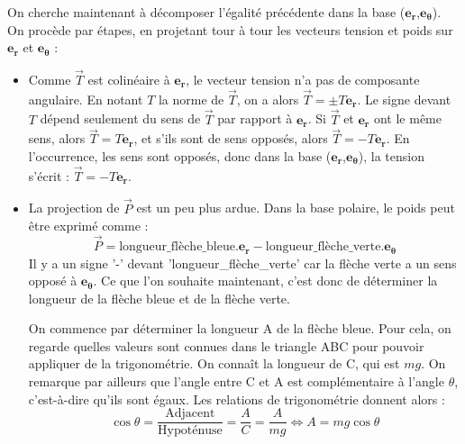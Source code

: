 \documentclass{article}
\begin{document}
On cherche maintenant à décomposer l'égalité précédente dans la base ($\mathbf{e_r}$,$\mathbf{e_\theta}$). On procède par étapes, en projetant tour à tour les vecteurs tension et poids sur $\mathbf{e_r}$ et $\mathbf{e_\theta}$ : 
\begin{itemize} 
    \item Comme $\vec T$ est colinéaire à $\mathbf{e_r}$, le vecteur tension n'a pas de composante angulaire. En notant $T$ la norme de $\vec T$, on a alors  $\vec T = \pm T\mathbf{e_r}$. Le signe devant $T$ dépend seulement du sens de $\vec T$ par rapport à $\mathbf{e_r}$. Si $\vec T$ et $\mathbf{e_r}$ ont le même sens, alors $\vec T =  T\mathbf{e_r}$, et s'ils sont de sens opposés, alors $\vec T = -T\mathbf{e_r}$. En l'occurrence, les sens sont opposés, donc dans la base ($\mathbf{e_r}$,$\mathbf{e_\theta}$), la tension s'écrit : $\vec T = -T\mathbf{e_r}$.
    


    \item La projection de $\vec P$ est un peu plus ardue. Dans la base polaire, le poids peut être exprimé comme :
      \begin{equation*}
           \label{projection_poids0}
           \vec P = 
           \textrm{longueur\_flèche\_bleue}.
           \mathbf{e_r} - \textrm{longueur\_flèche\_verte}.\mathbf{e_\theta}
      \end{equation*}
      Il y a un signe '-' devant 'longueur\_flèche\_verte' car la flèche verte a un sens opposé à $\mathbf{e_\theta}$.
      Ce que l'on souhaite maintenant, c'est donc de déterminer la longueur de la flèche bleue et de la flèche verte. 
    
      
      
    

    On commence par déterminer la longueur A de la flèche bleue. Pour cela, on regarde quelles valeurs sont connues dans le triangle ABC pour pouvoir appliquer de la trigonométrie. On connaît la longueur de C, qui est $mg$. On remarque par ailleurs que l'angle entre C et A est complémentaire à l'angle $\theta$, c'est-à-dire qu'ils sont égaux. Les relations de trigonométrie donnent alors : \begin{equation*}
      \label{projection_poids1}
     \cos{\theta} = \dfrac{\textrm{Adjacent}}{\textrm {Hypoténuse}} = \dfrac{A}{C} = \dfrac{A}{mg} \iff A = mg\cos{\theta}       
     \end{equation*} 
 


\end{itemize}
\end{document}
